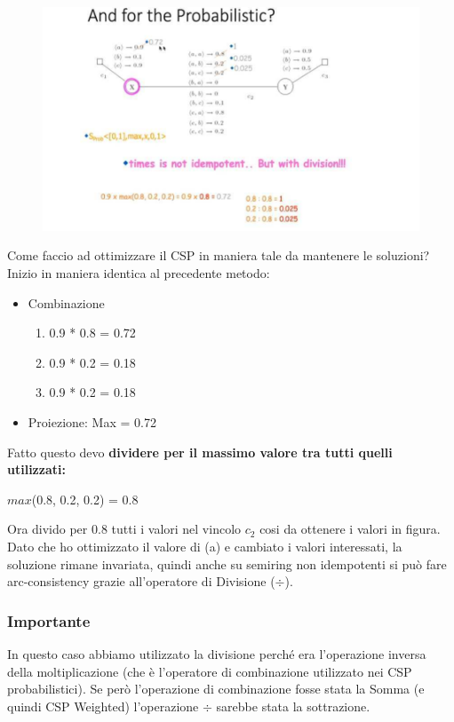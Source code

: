 \begin{figure}[htp]
    \centering
    \includegraphics[width=14cm, keepaspectratio]{img/Cap5/Probabilistic2.png}
\end{figure}

Come faccio ad ottimizzare il CSP in maniera tale da mantenere le soluzioni?
\\Inizio in maniera identica al precedente metodo:
\begin{itemize}
    \item Combinazione
          \begin{enumerate}
              \item 0.9 * 0.8 = 0.72
              \item 0.9 * 0.2 = 0.18
              \item 0.9 * 0.2 = 0.18
          \end{enumerate}
    \item Proiezione: Max = 0.72
\end{itemize}
\noindent Fatto questo devo \textbf{dividere per il massimo valore tra tutti
    quelli utilizzati:}
\begin{center}
    $max$(0.8, 0.2, 0.2) = 0.8
\end{center}
Ora divido per 0.8 tutti i valori nel vincolo $c_2$ cosi da ottenere i valori in
figura. Dato che ho ottimizzato il valore di (a) e cambiato i valori
interessati, la soluzione rimane invariata, quindi anche su semiring non
idempotenti si può fare arc-consistency grazie all'operatore di Divisione
($\div$).

\subsubsection{\textbf{Importante}} In questo caso abbiamo utilizzato la
divisione perché era l'operazione inversa della moltiplicazione (che è
l'operatore di combinazione utilizzato nei CSP probabilistici). Se però
l'operazione di combinazione fosse stata la Somma (e quindi CSP Weighted)
l'operazione $\div$ sarebbe stata la sottrazione.


